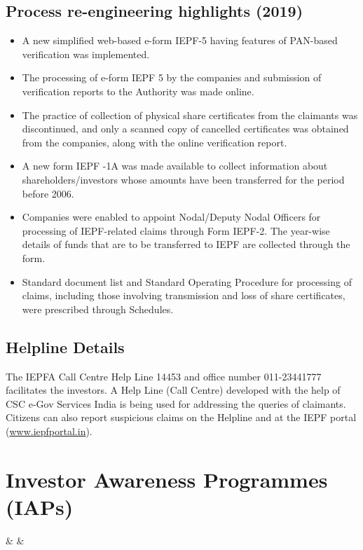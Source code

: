 \documentclass[openany]{book}
\begin{document}
\subsection{Process re-engineering highlights (2019)}
\begin{itemize}
    \item A new simplified web-based e-form IEPF-5 having features of PAN-based verification was implemented.
    \item The processing of e-form IEPF 5 by the companies and submission of verification reports to the Authority was made online.
    \item The practice of collection of physical share certificates from the claimants was discontinued, and only a scanned copy of cancelled certificates was obtained from the companies, along with the online verification report.
    \item A new form IEPF -1A was made available to collect information about shareholders/investors whose amounts have been transferred for the period before 2006.
    \item Companies were enabled to appoint Nodal/Deputy Nodal Officers for processing of IEPF-related claims through Form IEPF-2. The year-wise details of funds that are to be transferred to IEPF are collected through the form.
    \item Standard document list and Standard Operating Procedure for processing of claims, including those involving transmission and loss of share certificates, were prescribed through Schedules.
\end{itemize}

\subsection{Helpline Details}
The IEPFA Call Centre Help Line 14453 and office number 011-23441777 facilitates the investors. A Help Line (Call Centre) developed with the help of CSC e-Gov Services India is being used for addressing the queries of claimants. Citizens can also report suspicious claims on the Helpline and at the IEPF portal (\url{www.iepfportal.in}).



\section{Investor Awareness Programmes (IAPs)} \cite{iepfa_annual_reports} & \cite{iepfa_linkedin_posts} & \cite{iepfa_x_profile}
\end{document}
